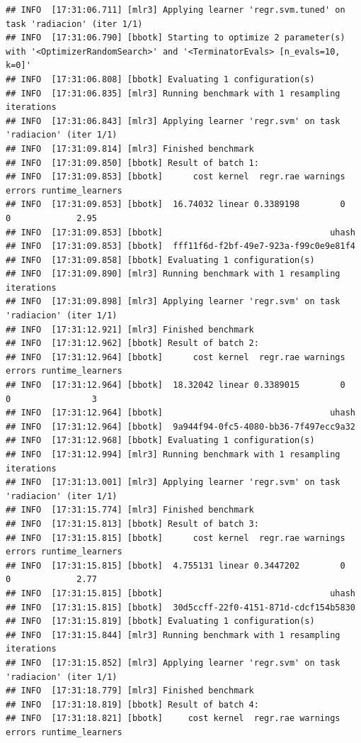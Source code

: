 \documentclass[
  11pt,
  a4paper,
]{article}
\begin{document}
\begin{verbatim}
## INFO  [17:31:06.711] [mlr3] Applying learner 'regr.svm.tuned' on task 'radiacion' (iter 1/1)
## INFO  [17:31:06.790] [bbotk] Starting to optimize 2 parameter(s) with '<OptimizerRandomSearch>' and '<TerminatorEvals> [n_evals=10, k=0]'
## INFO  [17:31:06.808] [bbotk] Evaluating 1 configuration(s)
## INFO  [17:31:06.835] [mlr3] Running benchmark with 1 resampling iterations
## INFO  [17:31:06.843] [mlr3] Applying learner 'regr.svm' on task 'radiacion' (iter 1/1)
## INFO  [17:31:09.814] [mlr3] Finished benchmark
## INFO  [17:31:09.850] [bbotk] Result of batch 1:
## INFO  [17:31:09.853] [bbotk]      cost kernel  regr.rae warnings errors runtime_learners
## INFO  [17:31:09.853] [bbotk]  16.74032 linear 0.3389198        0      0             2.95
## INFO  [17:31:09.853] [bbotk]                                 uhash
## INFO  [17:31:09.853] [bbotk]  fff11f6d-f2bf-49e7-923a-f99c0e9e81f4
## INFO  [17:31:09.858] [bbotk] Evaluating 1 configuration(s)
## INFO  [17:31:09.890] [mlr3] Running benchmark with 1 resampling iterations
## INFO  [17:31:09.898] [mlr3] Applying learner 'regr.svm' on task 'radiacion' (iter 1/1)
## INFO  [17:31:12.921] [mlr3] Finished benchmark
## INFO  [17:31:12.962] [bbotk] Result of batch 2:
## INFO  [17:31:12.964] [bbotk]      cost kernel  regr.rae warnings errors runtime_learners
## INFO  [17:31:12.964] [bbotk]  18.32042 linear 0.3389015        0      0                3
## INFO  [17:31:12.964] [bbotk]                                 uhash
## INFO  [17:31:12.964] [bbotk]  9a944f94-0fc5-4080-bb36-7f497ecc9a32
## INFO  [17:31:12.968] [bbotk] Evaluating 1 configuration(s)
## INFO  [17:31:12.994] [mlr3] Running benchmark with 1 resampling iterations
## INFO  [17:31:13.001] [mlr3] Applying learner 'regr.svm' on task 'radiacion' (iter 1/1)
## INFO  [17:31:15.774] [mlr3] Finished benchmark
## INFO  [17:31:15.813] [bbotk] Result of batch 3:
## INFO  [17:31:15.815] [bbotk]      cost kernel  regr.rae warnings errors runtime_learners
## INFO  [17:31:15.815] [bbotk]  4.755131 linear 0.3447202        0      0             2.77
## INFO  [17:31:15.815] [bbotk]                                 uhash
## INFO  [17:31:15.815] [bbotk]  30d5ccff-22f0-4151-871d-cdcf154b5830
## INFO  [17:31:15.819] [bbotk] Evaluating 1 configuration(s)
## INFO  [17:31:15.844] [mlr3] Running benchmark with 1 resampling iterations
## INFO  [17:31:15.852] [mlr3] Applying learner 'regr.svm' on task 'radiacion' (iter 1/1)
## INFO  [17:31:18.779] [mlr3] Finished benchmark
## INFO  [17:31:18.819] [bbotk] Result of batch 4:
## INFO  [17:31:18.821] [bbotk]     cost kernel  regr.rae warnings errors runtime_learners

\end{verbatim}
\end{document}
